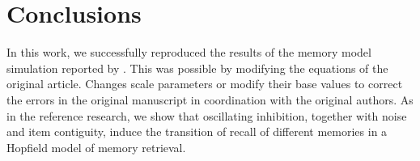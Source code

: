 \section{Conclusions}

In this work, we successfully reproduced the results of the memory model simulation reported by \cite{recanatesi2015}.
This was possible by modifying the equations of the original article.
Changes scale parameters or modify their base values to correct the errors in the original manuscript in coordination with the original authors.
As in the reference research, we show that oscillating inhibition, together with noise and item contiguity, induce the transition of recall of different memories in a Hopfield model of memory retrieval.
